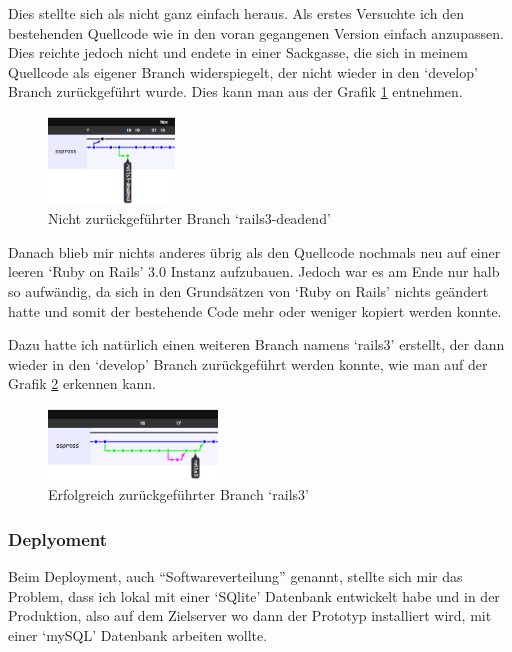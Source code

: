 Dies stellte sich als nicht ganz einfach heraus. Als erstes Versuchte ich
den bestehenden Quellcode wie in den voran gegangenen Version einfach anzupassen.
Dies reichte jedoch nicht und endete in einer Sackgasse, die sich in meinem
Quellcode als eigener Branch widerspiegelt, der nicht wieder in den `develop'
Branch zurückgeführt wurde. Dies kann man aus der Grafik \ref{deadend} entnehmen.

\begin{figure}[ht]
    \begin{center}
        \includegraphics[width=0.3\textwidth,angle=0]{./bilder/deadend.png}
        \caption{Nicht zurückgeführter Branch `rails3-deadend'}
        \label{deadend}
    \end{center}
\end{figure}

Danach blieb mir nichts anderes übrig als den Quellcode nochmals neu auf einer
leeren `Ruby on Rails' 3.0 Instanz aufzubauen. Jedoch war es am Ende nur halb
so aufwändig, da sich in den Grundsätzen von `Ruby on Rails' nichts geändert 
hatte und somit der bestehende Code mehr oder weniger kopiert werden konnte.

Dazu hatte ich natürlich einen weiteren Branch namens `rails3' erstellt, der
dann wieder in den `develop' Branch zurückgeführt werden konnte, wie man
auf der Grafik \ref{rails3} erkennen kann.

\begin{figure}[ht]
    \begin{center}
        \includegraphics[width=0.4\textwidth,angle=0]{./bilder/rails3.png}
        \caption{Erfolgreich zurückgeführter Branch `rails3'}
        \label{rails3}
    \end{center}
\end{figure}

\clearpage

\subsubsection{Deplyoment}
Beim Deployment, auch ``Softwareverteilung'' \cite{deployment} genannt, stellte 
sich mir das Problem, dass ich lokal mit einer `SQlite' Datenbank entwickelt habe
und in der Produktion, also auf dem Zielserver wo dann der Prototyp installiert
wird, mit einer `mySQL' Datenbank arbeiten wollte.

